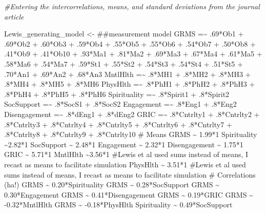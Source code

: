\documentclass[
  11pt,
]{book}
\newenvironment{Shaded}{\begin{snugshade}}{\end{snugshade}}
\newcommand{\CommentTok}[1]{\textcolor[rgb]{0.37,0.37,0.37}{\textit{#1}}}
\newcommand{\NormalTok}[1]{#1}
\newcommand{\OtherTok}[1]{\textcolor[rgb]{0.37,0.37,0.37}{#1}}
\newcommand{\StringTok}[1]{\textcolor[rgb]{0.5,0.5,0.5}{#1}}
\begin{document}
\begin{Shaded}
\begin{Highlighting}[]
\CommentTok{\#Entering the intercorrelations, means, and standard deviations from the journal article}

\NormalTok{Lewis\_generating\_model }\OtherTok{\textless{}{-}} \StringTok{\textquotesingle{}}
\StringTok{        \#\#measurement model}
\StringTok{        GRMS  =\textasciitilde{} .69*Ob1 + .69*Ob2 + .60*Ob3 + .59*Ob4 + .55*Ob5 + .55*Ob6 + .54*Ob7 + .50*Ob8 + .41*Ob9 + .41*Ob10 + .93*Ma1 + .81*Ma2 + .69*Ma3 + .67*Ma4 + .61*Ma5 + .58*Ma6 + .54*Ma7 + .59*St1 + .55*St2 + .54*St3 + .54*St4 + .51*St5 + .70*An1 + .69*An2 + .68*An3}
\StringTok{        MntlHlth  =\textasciitilde{} .8*MH1 + .8*MH2 + .8*MH3 + .8*MH4 + .8*MH5 + .8*MH6}
\StringTok{        PhysHlth  =\textasciitilde{} .8*PhH1 + .8*PhH2 + .8*PhH3 + .8*PhH4 + .8*PhH5 + .8*PhH6}
\StringTok{        Spirituality  =\textasciitilde{} .8*Spirit1 + .8*Spirit2}
\StringTok{        SocSupport  =\textasciitilde{} .8*SocS1 + .8*SocS2}
\StringTok{        Engagement  =\textasciitilde{} .8*Eng1 + .8*Eng2}
\StringTok{        Disengagement  =\textasciitilde{}  .8*dEng1 + .8*dEng2}
\StringTok{        GRIC  =\textasciitilde{} .8*Cntrlty1 + .8*Cntrlty2 + .8*Cntrlty3 + .8*Cntrlty4 + .8*Cntrlty5 + .8*Cntrlty6 + .8*Cntrlty7 + .8*Cntrlty8 + .8*Cntrlty9 + .8*Cntrlty10}
\StringTok{   }
\StringTok{        \# Means}
\StringTok{         GRMS \textasciitilde{} 1.99*1}
\StringTok{         Spirituality \textasciitilde{}2.82*1}
\StringTok{         SocSupport \textasciitilde{} 2.48*1}
\StringTok{         Engagement \textasciitilde{} 2.32*1}
\StringTok{         Disengagement \textasciitilde{} 1.75*1}
\StringTok{         GRIC \textasciitilde{} 5.71*1}
\StringTok{         MntlHlth \textasciitilde{}3.56*1 \#Lewis et al used sums instead of means, I recast as means to facilitate simulation}
\StringTok{         PhysHlth \textasciitilde{} 3.51*1 \#Lewis et al used sums instead of means, I recast as means to facilitate simulation}
\StringTok{         }
\StringTok{        \# Correlations (ha!)}
\StringTok{         GRMS \textasciitilde{} 0.20*Spirituality}
\StringTok{         GRMS \textasciitilde{} 0.28*SocSupport}
\StringTok{         GRMS \textasciitilde{} 0.30*Engagement}
\StringTok{         GRMS \textasciitilde{} 0.41*Disengagement}
\StringTok{         GRMS \textasciitilde{} 0.19*GRIC}
\StringTok{         GRMS \textasciitilde{} {-}0.32*MntlHlth}
\StringTok{         GRMS \textasciitilde{} {-}0.18*PhysHlth}
\StringTok{         }
\StringTok{         Spirituality \textasciitilde{} 0.49*SocSupport}

\end{Highlighting}
\end{Shaded}
\end{document}
